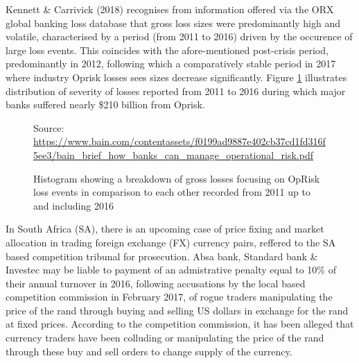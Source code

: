 \documentclass{DissertateUSU}
\begin{document}
Kennett \& Carrivick (2018) recognises from information offered via the
ORX global banking loss database that gross loss sizes were
predominantly high and volatile, characterised by a period (from 2011 to
2016) driven by the occurence of large loss events. This coincides with
the afore-mentioned post-crisis period, predominantly in 2012, following
which a comparatively stable period in 2017 where industry Oprisk losses
sees sizes decrease significantly. Figure \ref{bank-oprisk_fig}
illustrates distribution of severity of losses reported from 2011 to
2016 during which major banks suffered nearly \$210 billion from Oprisk.

\begin{figure}
\centering
{}
             {Source: \url{https://www.bain.com/contentassets/f0199ad9887e402cb37cd1fd316f5ee3/bain_brief_how_banks_can_manage_operational_risk.pdf}}
\caption[Losses suffered from 2011 to 2016 from Oprisk]{Histogram showing a breakdown of gross losses focusing on OpRisk loss events in comparison to each other recorded from 2011 up to and including 2016}
\label{bank-oprisk_fig}
\end{figure}

In South Africa (SA), there is an upcoming case of price fixing and
market allocation in trading foreign exchange (FX) currency pairs,
reffered to the SA based competition tribunal for prosecution. Absa
bank, Standard bank \& Investec may be liable to payment of an
admistrative penalty equal to 10\% of their annual turnover in 2016,
following accusations by the local based competition commission in
February 2017, of rogue traders manipulating the price of the rand
through buying and selling US dollars in exchange for the rand at fixed
prices. According to the competition commission, it has been alleged
that currency traders have been colluding or manipulating the price of
the rand through these buy and sell orders to change supply of the
currency.\medskip
\end{document}
